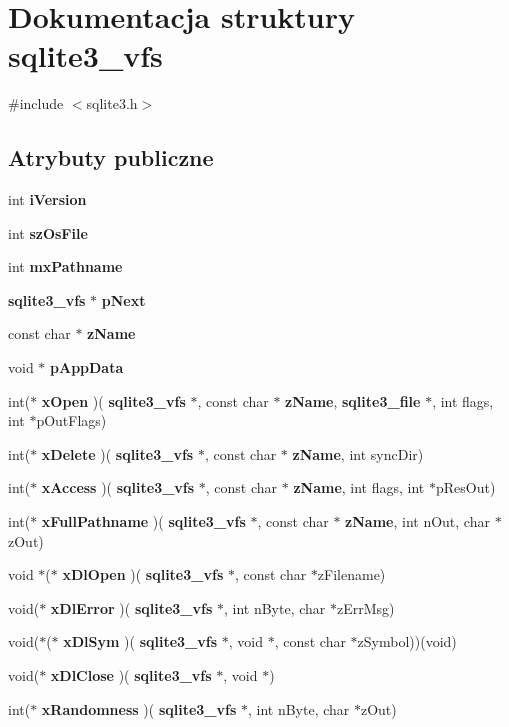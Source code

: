 \section{Dokumentacja struktury sqlite3\+\_\+vfs}
\label{structsqlite3__vfs}


{\ttfamily \#include $<$sqlite3.\+h$>$}

\subsection*{Atrybuty publiczne}
\begin{DoxyCompactItemize}
\item 
int \textbf{ i\+Version}
\item 
int \textbf{ sz\+Os\+File}
\item 
int \textbf{ mx\+Pathname}
\item 
\textbf{ sqlite3\+\_\+vfs} $\ast$ \textbf{ p\+Next}
\item 
const char $\ast$ \textbf{ z\+Name}
\item 
void $\ast$ \textbf{ p\+App\+Data}
\item 
int($\ast$ \textbf{ x\+Open} )(\textbf{ sqlite3\+\_\+vfs} $\ast$, const char $\ast$\textbf{ z\+Name}, \textbf{ sqlite3\+\_\+file} $\ast$, int flags, int $\ast$p\+Out\+Flags)
\item 
int($\ast$ \textbf{ x\+Delete} )(\textbf{ sqlite3\+\_\+vfs} $\ast$, const char $\ast$\textbf{ z\+Name}, int sync\+Dir)
\item 
int($\ast$ \textbf{ x\+Access} )(\textbf{ sqlite3\+\_\+vfs} $\ast$, const char $\ast$\textbf{ z\+Name}, int flags, int $\ast$p\+Res\+Out)
\item 
int($\ast$ \textbf{ x\+Full\+Pathname} )(\textbf{ sqlite3\+\_\+vfs} $\ast$, const char $\ast$\textbf{ z\+Name}, int n\+Out, char $\ast$z\+Out)
\item 
void $\ast$($\ast$ \textbf{ x\+Dl\+Open} )(\textbf{ sqlite3\+\_\+vfs} $\ast$, const char $\ast$z\+Filename)
\item 
void($\ast$ \textbf{ x\+Dl\+Error} )(\textbf{ sqlite3\+\_\+vfs} $\ast$, int n\+Byte, char $\ast$z\+Err\+Msg)
\item 
void($\ast$($\ast$ \textbf{ x\+Dl\+Sym} )(\textbf{ sqlite3\+\_\+vfs} $\ast$, void $\ast$, const char $\ast$z\+Symbol))(void)
\item 
void($\ast$ \textbf{ x\+Dl\+Close} )(\textbf{ sqlite3\+\_\+vfs} $\ast$, void $\ast$)
\item 
int($\ast$ \textbf{ x\+Randomness} )(\textbf{ sqlite3\+\_\+vfs} $\ast$, int n\+Byte, char $\ast$z\+Out)

\end{DoxyCompactItemize}
